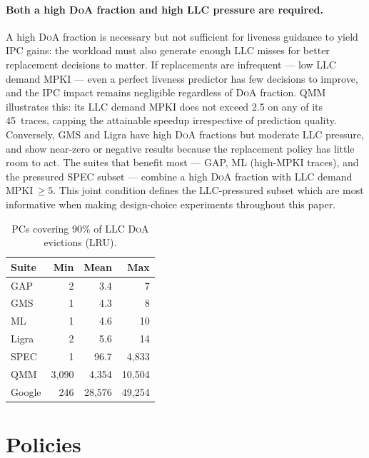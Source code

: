 \documentclass[conference]{IEEEtran}
\newcommand{\lru}{\textsc{LRU}\xspace}
\newcommand{\doa}{\textsc{DoA}\xspace}
\newcommand{\llc}{\textsc{LLC}\xspace}
\begin{document}
\paragraph{Both a high \doa fraction and high \llc pressure are required.}
A high \doa fraction is necessary but not sufficient for liveness guidance to
yield IPC gains: the workload must also generate enough \llc misses for better
replacement decisions to matter.
If replacements are infrequent --- low \llc demand \textsc{MPKI} --- even a
perfect liveness predictor has few decisions to improve, and the IPC impact
remains negligible regardless of \doa fraction.
QMM illustrates this: its \llc demand \textsc{MPKI} does not exceed 2.5 on any
of its 45~traces, capping the attainable speedup irrespective of prediction
quality.
Conversely, GMS and Ligra have high \doa fractions but moderate \llc pressure,
and show near-zero or negative results because the replacement policy has little
room to act.
The suites that benefit most --- GAP, ML (high-\textsc{MPKI} traces), and the
pressured SPEC subset --- combine a high \doa fraction with \llc demand
\textsc{MPKI}$\,\geq 5$.
This joint condition defines the LLC-pressured subset which are most informative 
when making design-choice experiments throughout this paper.

\begin{table}[b!]
\centering
\small
\caption{PCs covering 90\% of LLC \doa evictions (\lru{}).}
\label{tab:concentration}
\begin{tabular}{lrrr}
\toprule
\textbf{Suite} & \textbf{Min} & \textbf{Mean} & \textbf{Max} \\
\midrule
GAP   & 2       & 3.4     & 7        \\
GMS   & 1       & 4.3     & 8        \\
ML    & 1       & 4.6     & 10       \\
Ligra & 2       & 5.6     & 14       \\
SPEC  & 1       & 96.7    & 4{,}833  \\
QMM   & 3{,}090 & 4{,}354 & 10{,}504 \\
Google & 246    & 28{,}576 & 49{,}254 \\
\bottomrule
\end{tabular}
\end{table}

\section{Policies}
\end{document}
